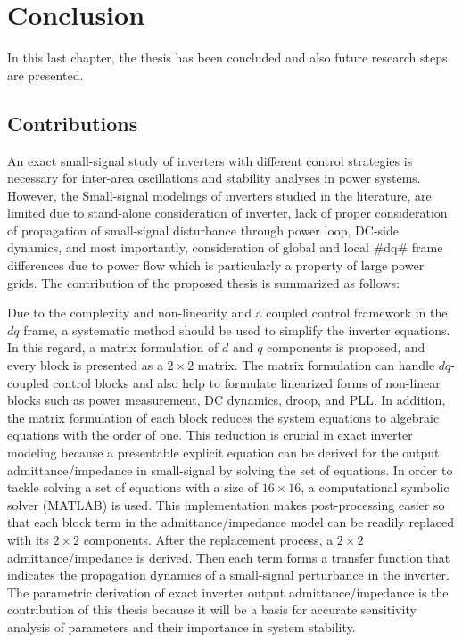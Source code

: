 \chapter{Conclusion}\label{conc}
In this last chapter, the thesis has been concluded and also future research steps are presented.
\section{Contributions}
An exact small-signal study of inverters with different control strategies is necessary for inter-area oscillations and stability analyses in power systems. However, the Small-signal modelings of inverters studied in the literature, are limited due to stand-alone consideration of inverter, lack of proper consideration of propagation of small-signal disturbance through power loop, DC-side dynamics, and most importantly, consideration of global and local #dq# frame differences due to power flow which is particularly a property of large power grids. The contribution of the proposed thesis is summarized as follows:

Due to the complexity and non-linearity and a coupled control framework in the $dq$ frame, a systematic method should be used to simplify the inverter equations. In this regard, a matrix formulation of $d$ and $q$ components is proposed, and every block is presented as a $2 \times 2$ matrix. The matrix formulation can handle $dq$- coupled control blocks and also help to formulate linearized forms of non-linear blocks such as power measurement, DC dynamics, droop, and PLL. In addition, the matrix formulation of each block reduces the system equations to algebraic equations with the order of one. This reduction is crucial in exact inverter modeling because a presentable explicit equation can be derived for the output admittance/impedance in small-signal by solving the set of equations. In order to tackle solving a set of equations with a size of $16 \times 16$, a computational symbolic solver (MATLAB) is used. This implementation makes post-processing easier so that each block term in the admittance/impedance model can be readily replaced with its $2 \times 2$ components. After the replacement process, a $2 \times 2$ admittance/impedance is derived. Then each term forms a transfer function that indicates the propagation dynamics of a small-signal perturbance in the inverter. The parametric derivation of exact inverter output admittance/impedance is the contribution of this thesis because it will be a basis for accurate sensitivity analysis of parameters and their importance in system stability. 
 
